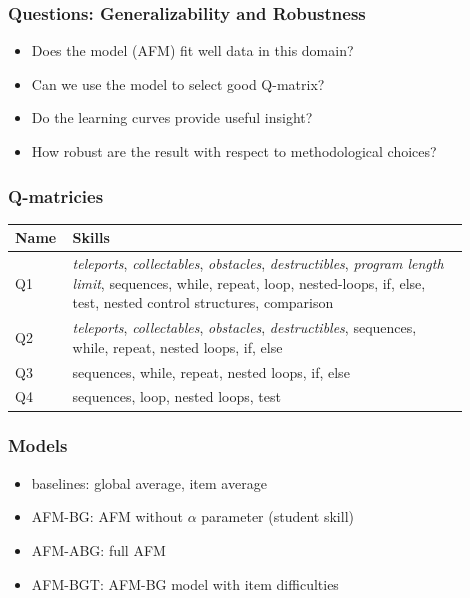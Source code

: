 \documentclass[bigger]{beamer}
\begin{document}
\begin{frame}
  \frametitle{Questions: Generalizability and Robustness}

  \begin{itemize}
  \item Does the model (AFM) fit well data in this domain?
  \item Can we use the model to select good Q-matrix?
  \item Do the learning curves provide useful insight?
  \item How robust are the result with respect to methodological choices?
  \end{itemize}
\end{frame}

\begin{frame}
  \frametitle{Q-matricies}

  \begin{center}
  \begin{tabular}{p{0.08\linewidth}p{0.82\linewidth}}
    \toprule
    Name & Skills\\
    \midrule
    Q1 & \emph{teleports}, \emph{collectables}, \emph{obstacles},
    \emph{destructibles}, \emph{program length limit}, sequences, while,
    repeat, loop, nested-loops, if, else, test, nested control structures,
    comparison\\
    Q2 & \emph{teleports}, \emph{collectables}, \emph{obstacles},
    \emph{destructibles}, sequences, while, repeat, nested loops, if, else\\
    Q3 & sequences, while, repeat, nested loops, if, else\\
    Q4 & sequences, loop, nested loops, test\\
    \bottomrule
  \end{tabular}    
  \end{center}
\end{frame}

\begin{frame}
  \frametitle{Models}

  \begin{itemize}
  \item baselines: global average, item average
  \item AFM-BG: AFM without $\alpha$ parameter (student skill)
  \item AFM-ABG: full AFM 
  \item AFM-BGT: AFM-BG model with item difficulties
  \end{itemize}
\end{frame}
\end{document}
